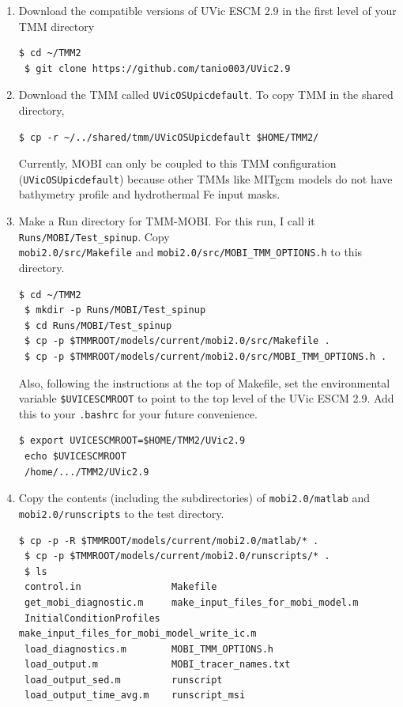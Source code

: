 \documentclass[a4paper]{article}
\def\noin{\noindent }
\begin{document}
\begin{enumerate}

\item Download the compatible versions of UVic ESCM 2.9 in the first level of your TMM directory
\begin{lstlisting}[style=DOS]
 $ cd ~/TMM2
 $ git clone https://github.com/tanio003/UVic2.9
\end{lstlisting}

\item Download the TMM called \verb|UVicOSUpicdefault|. To copy TMM in the shared directory, 
\begin{lstlisting}[style=DOS]
 $ cp -r ~/../shared/tmm/UVicOSUpicdefault $HOME/TMM2/
\end{lstlisting}

\noin Currently, MOBI can only be coupled to this TMM configuration (\verb|UVicOSUpicdefault|) because other TMMs like MITgcm models do not have bathymetry profile and hydrothermal Fe input masks.

\item Make a Run directory for TMM-MOBI. For this run, I call it \verb|Runs/MOBI/Test_spinup|. Copy \\ \verb|mobi2.0/src/Makefile| and \verb|mobi2.0/src/MOBI_TMM_OPTIONS.h| to this directory. 
\begin{lstlisting}[style=DOS]
 $ cd ~/TMM2
 $ mkdir -p Runs/MOBI/Test_spinup
 $ cd Runs/MOBI/Test_spinup
 $ cp -p $TMMROOT/models/current/mobi2.0/src/Makefile .
 $ cp -p $TMMROOT/models/current/mobi2.0/src/MOBI_TMM_OPTIONS.h . 
\end{lstlisting}
\noin Also, following the instructions at the top of Makefile, set the environmental variable \verb|$UVICESCMROOT| to point to the top level of the UVic ESCM 2.9. Add this to your \verb|.bashrc| for your future convenience.
\begin{lstlisting}[style=DOS]
 $ export UVICESCMROOT=$HOME/TMM2/UVic2.9
 echo $UVICESCMROOT
 /home/.../TMM2/UVic2.9
\end{lstlisting}

\item Copy the contents (including the subdirectories) of \verb|mobi2.0/matlab| and  \verb|mobi2.0/runscripts| to the test directory.
\begin{lstlisting}[style=DOS]
 $ cp -p -R $TMMROOT/models/current/mobi2.0/matlab/* .
 $ cp -p $TMMROOT/models/current/mobi2.0/runscripts/* .
 $ ls
 control.in                Makefile
 get_mobi_diagnostic.m     make_input_files_for_mobi_model.m
 InitialConditionProfiles  make_input_files_for_mobi_model_write_ic.m
 load_diagnostics.m        MOBI_TMM_OPTIONS.h
 load_output.m             MOBI_tracer_names.txt
 load_output_sed.m         runscript
 load_output_time_avg.m    runscript_msi
\end{lstlisting}


\end{enumerate}
\end{document}
